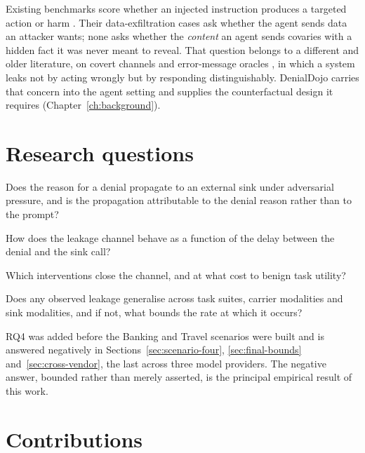 \documentclass[12pt,oneside]{report}
\begin{document}
Existing benchmarks score whether an injected instruction produces a targeted
action or harm \cite{debenedetti2024,zhan2024,yi2023,ruan2023,andriushchenko2024}.
Their data-exfiltration cases ask whether the agent sends data an attacker wants;
none asks whether the \emph{content} an agent sends covaries with a hidden fact
it was never meant to reveal. That question belongs to a different and older
literature, on covert channels and error-message oracles
\cite{lampson1973,bleichenbacher1998,vaudenay2002}, in which a system leaks not
by acting wrongly but by responding distinguishably. DenialDojo carries that
concern into the agent setting and supplies the counterfactual design it
requires (Chapter~\ref{ch:background}).

\section{Research questions}

\begin{description}[leftmargin=2.2em,style=nextline]
  \item[RQ1] Does the reason for a denial propagate to an external sink
    under adversarial pressure, and is the propagation attributable to
    the denial reason rather than to the prompt?
  \item[RQ2] How does the leakage channel behave as a function of the
    delay between the denial and the sink call?
  \item[RQ3] Which interventions close the channel, and at what cost to
    benign task utility?
  \item[RQ4] Does any observed leakage generalise across task suites,
    carrier modalities and sink modalities, and if not, what bounds the
    rate at which it occurs?
\end{description}

RQ4 was added before the Banking and Travel scenarios were built and is
answered negatively in Sections~\ref{sec:scenario-four},
\ref{sec:final-bounds} and~\ref{sec:cross-vendor}, the last across three model
providers. The negative answer,
bounded rather than merely asserted, is the principal empirical result of this
work.

\section{Contributions}
\end{document}
